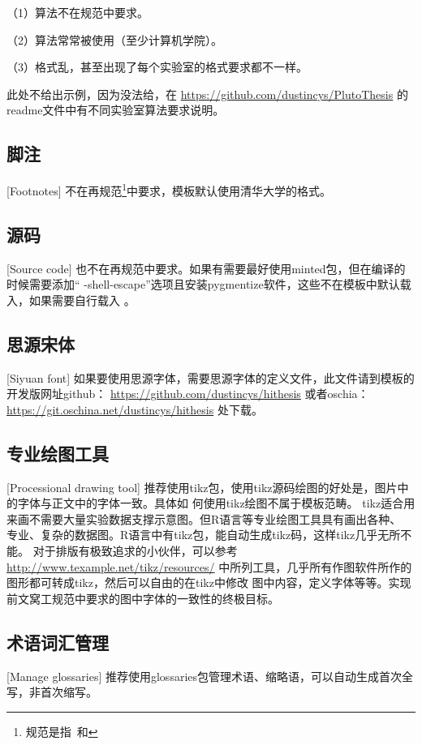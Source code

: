 （1）算法不在规范中要求。

（2）算法常常被使用（至少计算机学院）。

（3）格式乱，甚至出现了每个实验室的格式要求都不一样。

此处不给出示例，因为没法给，在
\href{https://github.com/dustincys/PlutoThesis}{https://github.com/dustincys/PlutoThesis}
的readme文件中有不同实验室算法要求说明。

\subsection{脚注}[Footnotes]
不在再规范\footnote{规范是指\PGR\ 和\UGR}中要求，模板默认使用清华大学的格式。

\subsection{源码}[Source code]
也不在再规范中要求。如果有需要最好使用minted包，但在编译的时候需要添加“
-shell-escape”选项且安装pygmentize软件，这些不在模板中默认载入，如果需要自行载入
。
\subsection{思源宋体}[Siyuan font]
如果要使用思源字体，需要思源字体的定义文件，此文件请到模板的开发版网址github：
\href{https://github.com/dustincys/hithesis}{https://github.com/dustincys/hithesis}
或者oschia：
\href{https://git.oschina.net/dustincys/hithesis}{https://git.oschina.net/dustincys/hithesis}
处下载。

\subsection{专业绘图工具}[Processional drawing tool]
\label{drawtool}
推荐使用tikz包，使用tikz源码绘图的好处是，图片中的字体与正文中的字体一致。具体如
何使用tikz绘图不属于模板范畴。
tikz适合用来画不需要大量实验数据支撑示意图。但R语言等专业绘图工具具有画出各种、
专业、复杂的数据图。R语言中有tikz包，能自动生成tikz码，这样tikz几乎无所不能。
对于排版有极致追求的小伙伴，可以参考
\href{http://www.texample.net/tikz/resources/}{http://www.texample.net/tikz/resources/}
中所列工具，几乎所有作图软件所作的图形都可转成tikz，然后可以自由的在tikz中修改
图中内容，定义字体等等。实现前文窝工规范中要求的图中字体的一致性的终极目标。


\subsection{术语词汇管理}[Manage glossaries]
推荐使用glossaries包管理术语、缩略语，可以自动生成首次全写，非首次缩写。


